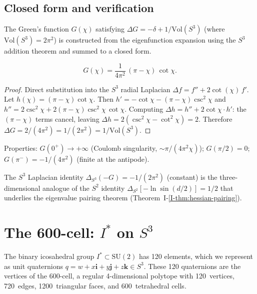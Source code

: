 \subsection{Closed form and verification}

The Green's function $G(\chi)$ satisfying
$\Delta G = -\delta + 1/\mathrm{Vol}(S^3)$ (where $\mathrm{Vol}(S^3) = 2\pi^2$)
is constructed from the eigenfunction expansion using the $S^3$ addition
theorem and summed to a closed form.

\begin{theorem}\label{thm:green-s3}
\begin{equation}\label{eq:green-s3}
  G(\chi) = \frac{1}{4\pi^2}\,(\pi - \chi)\,\cot\chi.
\end{equation}
\end{theorem}

\begin{proof}
Direct substitution into the $S^3$ radial Laplacian
$\Delta f = f'' + 2\cot(\chi)\,f'$.  Let $h(\chi) = (\pi - \chi)\cot\chi$.
Then $h' = -\cot\chi - (\pi - \chi)\csc^2\chi$ and
$h'' = 2\csc^2\chi + 2(\pi - \chi)\csc^2\chi\,\cot\chi$.
Computing $\Delta h = h'' + 2\cot\chi\cdot h'$:
the $(\pi - \chi)$ terms cancel, leaving
$\Delta h = 2(\csc^2\chi - \cot^2\chi) = 2$.
Therefore $\Delta G = 2/(4\pi^2) = 1/(2\pi^2) = 1/\mathrm{Vol}(S^3)$.
\end{proof}

Properties: $G(0^+) \to +\infty$ (Coulomb singularity,
$\sim \pi/(4\pi^2\chi)$); $G(\pi/2) = 0$;
$G(\pi^-) = -1/(4\pi^2)$ (finite at the antipode).

\begin{remark}
The $S^3$ Laplacian identity $\Delta_{S^3}(-G) = -1/(2\pi^2)$ (constant)
is the three-dimensional analogue of the $S^2$ identity
$\Delta_{S^2}[-\ln\sin(d/2)] = 1/2$ that underlies the eigenvalue
pairing theorem (Theorem~I-\ref{I-thm:hessian-pairing}).
\end{remark}

\section{The 600-cell: $I^*$ on $S^3$}
\label{sec:600cell}

The binary icosahedral group $I^* \subset \mathrm{SU}(2)$ has 120
elements, which we represent as unit quaternions
$q = w + x\mathbf{i} + y\mathbf{j} + z\mathbf{k} \in S^3$.
These 120 quaternions are the vertices of the 600-cell, a regular
4-dimensional polytope with 120~vertices, 720~edges,
1200~triangular faces, and 600~tetrahedral cells.

